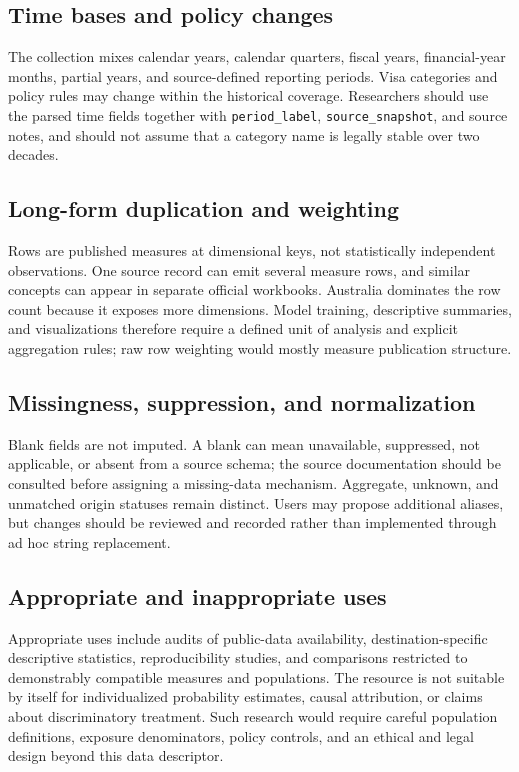 \documentclass[runningheads]{llncs}
\begin{document}
\subsection{Time bases and policy changes}

The collection mixes calendar years, calendar quarters, fiscal years, financial-year months, partial years, and source-defined reporting periods. Visa categories and policy rules may change within the historical coverage. Researchers should use the parsed time fields together with \texttt{period\_label}, \texttt{source\_snapshot}, and source notes, and should not assume that a category name is legally stable over two decades.

\subsection{Long-form duplication and weighting}

Rows are published measures at dimensional keys, not statistically independent observations. One source record can emit several measure rows, and similar concepts can appear in separate official workbooks. Australia dominates the row count because it exposes more dimensions. Model training, descriptive summaries, and visualizations therefore require a defined unit of analysis and explicit aggregation rules; raw row weighting would mostly measure publication structure.

\subsection{Missingness, suppression, and normalization}

Blank fields are not imputed. A blank can mean unavailable, suppressed, not applicable, or absent from a source schema; the source documentation should be consulted before assigning a missing-data mechanism. Aggregate, unknown, and unmatched origin statuses remain distinct. Users may propose additional aliases, but changes should be reviewed and recorded rather than implemented through ad hoc string replacement.

\subsection{Appropriate and inappropriate uses}

Appropriate uses include audits of public-data availability, destination-specific descriptive statistics, reproducibility studies, and comparisons restricted to demonstrably compatible measures and populations. The resource is not suitable by itself for individualized probability estimates, causal attribution, or claims about discriminatory treatment. Such research would require careful population definitions, exposure denominators, policy controls, and an ethical and legal design beyond this data descriptor.
\end{document}

